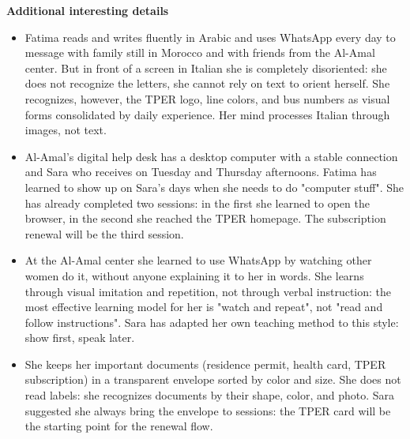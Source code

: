 ﻿\documentclass[11pt,a4paper]{article}
\begin{document}
\begin{center}
\vspace{0.3cm}



\begin{tcolorbox}[base,colback=backgroundColor!50]
    \textbf{Additional interesting details} \\[4pt]
    {\small
    \begin{itemize}[leftmargin=*]
        \item Fatima reads and writes fluently in Arabic
        and uses WhatsApp every day to message with
        family still in Morocco and with friends
        from the Al-Amal center. But in front of a screen
        in Italian she is completely disoriented:
        she does not recognize the letters, she cannot rely
        on text to orient herself. She recognizes, however, the TPER
        logo, line colors, and bus numbers
        as visual forms consolidated by daily
        experience. Her mind processes Italian
        through images, not text.

        \item Al-Amal's digital help desk has a
        desktop computer with a stable connection and
        Sara who receives on Tuesday and Thursday afternoons.
        Fatima has learned to show up on Sara's
        days when she needs to do "computer stuff".
        She has already completed two sessions: in the first
        she learned to open the browser, in the second
        she reached the TPER homepage. The subscription
        renewal will be the third session.

        \item At the Al-Amal center she learned to use
        WhatsApp by watching other women do it,
        without anyone explaining it to her in words.
        She learns through visual imitation and repetition,
        not through verbal instruction: the most effective
        learning model for her is
        "watch and repeat", not "read and follow
        instructions". Sara has adapted
        her own teaching method
        to this style: show first, speak later.

        \item She keeps her important documents
        (residence permit, health card,
        TPER subscription) in a transparent envelope
        sorted by color and size. She does not read
        labels: she recognizes documents by their
        shape, color, and photo.
        Sara suggested she always bring
        the envelope to sessions: the TPER card
        will be the starting point for the renewal
        flow.
    \end{itemize}
    }
\end{tcolorbox}


\end{center}
\end{document}
